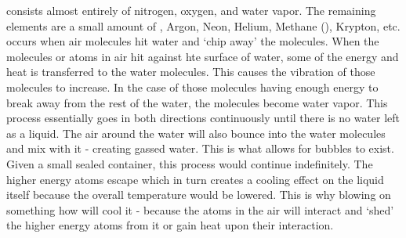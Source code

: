  consists almost entirely of nitrogen, oxygen, and water vapor. The remaining elements are a small amount of , Argon, Neon, Helium, Methane (), Krypton, etc.  occurs when air molecules hit water and `chip away' the  molecules. When the molecules or atoms in air hit against hte surface of water, some of the energy and heat is transferred to the water molecules. This causes the vibration of those molecules to increase. In the case of those molecules having enough energy to break away from the rest of the water, the molecules become water vapor. This process essentially goes in both directions continuously until there is no water left as a liquid. The air around the water will also bounce into the water molecules and mix with it - creating gassed water. This is what allows for bubbles to exist. Given a small sealed container, this process would continue indefinitely. The higher energy atoms escape which in turn creates a cooling effect on the liquid itself because the overall temperature would be lowered. This is why blowing on something how will cool it - because the atoms in the air will interact and `shed' the higher energy atoms from it or gain heat upon their interaction. 